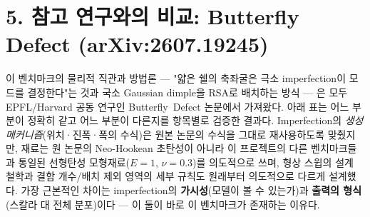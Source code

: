 \documentclass[11pt]{article}
\begin{document}
\section{5. 참고 연구와의 비교: Butterfly Defect (arXiv:2607.19245)}

이 벤치마크의 물리적 직관과 방법론 --- "얇은 쉘의 축좌굴은 극소 imperfection이
모드를 결정한다"는 것과 국소 Gaussian dimple을 RSA로 배치하는 방식 --- 은
모두 EPFL/Harvard 공동 연구인 Butterfly~Defect 논문에서 가져왔다. 아래 표는
어느 부분이 정확히 같고 어느 부분이 다른지를 항목별로 검증한 결과다.
Imperfection의 \emph{생성 메커니즘}(위치·진폭·폭의 수식)은 원본 논문의
수식을 그대로 재사용하도록 맞췄지만, 재료는 원 논문의 Neo-Hookean 초탄성이
아니라 이 프로젝트의 다른 벤치마크들과 통일된 선형탄성 모형재료($E{=}1$,
$\nu{=}0.3$)를 의도적으로 쓰며, 형상 스윕의 설계 철학과 결함 개수/배치 제외
영역의 세부 규칙도 원래부터 의도적으로 다르게 설계했다. 가장
근본적인 차이는 imperfection의 \textbf{가시성}(모델이 볼 수 있는가)과
\textbf{출력의 형식}(스칼라 대 전체 분포)이다 --- 이 둘이 바로 이 벤치마크가
존재하는 이유다.
\end{document}
